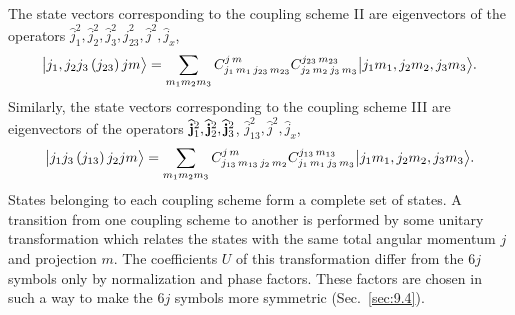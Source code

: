 The state vectors corresponding to the coupling scheme II are eigenvectors of the operators $\widehat{j}_{1}^{2}, \widehat{j}_{2}^{2}, \widehat{j}_{3}^{2}, \widehat{j}_{23}^{2}, \widehat{j}^{2}, \widehat{j}_{x}$,
\begin{equation}
\bigl| j_{1}, j_{2} j_{3}\left(j_{23}\right) j m \bigr\rangle=\sum_{m_{1} m_{2} m_{3}} C_{j_{1}\,m_{1}\,j_{23}\,m_{23}}^{j\,m} C_{j_{2}\,m_{2}\,j_{3}\,m_{3}}^{j_{23}\,m_{23}}\bigl| j_{1} m_{1}, j_{2} m_{2}, j_{3} m_{3} \bigr\rangle . \label{eq:9:1:3}
\end{equation}
Similarly, the state vectors corresponding to the coupling scheme III are eigenvectors of the operators $\widehat{\mathbf{j}}_{1}^{2}, \widehat{\mathbf{j}}_{2}^{2}, \widehat{\mathbf{j}}_{3}^{2}$, $\widehat{j}_{13}^{2}, \widehat{j}^{2}, \widehat{j}_{x}$,
\begin{equation}
\bigl| j_{1} j_{3}\left(j_{13}\right) j_{2} j m \bigr\rangle=\sum_{m_{1} m_{2} m_{3}} C_{j_{13}\,m_{13}\,j_{2}\,m_{2}}^{j\,m} C_{j_{1}\,m_{1}\,j_{3}\,m_{3}}^{j_{13}\,m_{13}}\bigl| j_{1} m_{1}, j_{2} m_{2}, j_{3} m_{3} \bigr\rangle . \label{eq:9:1:4}
\end{equation}
States belonging to each coupling scheme form a complete set of states. A transition from one coupling scheme to another is performed by some unitary transformation which relates the states with the same total angular momentum $j$ and projection $m$. The coefficients $U$ of this transformation differ from the $6 j$ symbols only by normalization and phase factors. These factors are chosen in such a way to make the $6 j$ symbols more symmetric (Sec.~\ref{sec:9.4}).

